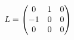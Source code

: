 \documentclass[preview]{standalone}
\begin{document}
\begin{align*}
\special{dvisvgm:raw <g id='unique000'>}L=\begin{pmatrix}0&1&0\\-1&0&0\\0&0&0\end{pmatrix}\special{dvisvgm:raw </g>}
\end{align*}
\end{document}
